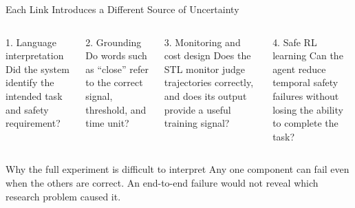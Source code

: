 \documentclass[aspectratio=169]{beamer}
\begin{document}
\begin{frame}{Each Link Introduces a Different Source of Uncertainty}
\begin{columns}[T]
\begin{block}{1. Language interpretation}
\footnotesize
Did the system identify the intended task and safety requirement?
\end{block}
\begin{block}{2. Grounding}
\footnotesize
Do words such as ``close'' refer to the correct signal, threshold, and time unit?
\end{block}

\begin{block}{3. Monitoring and cost design}
\footnotesize
Does the STL monitor judge trajectories correctly, and does its output provide a useful training signal?
\end{block}
\begin{block}{4. Safe RL learning}
\footnotesize
Can the agent reduce temporal safety failures without losing the ability to complete the task?
\end{block}
\end{columns}

\begin{block}{Why the full experiment is difficult to interpret}
\large
Any one component can fail even when the others are correct. An end-to-end failure would not reveal which research problem caused it.
\end{block}
\end{frame}
\end{document}
